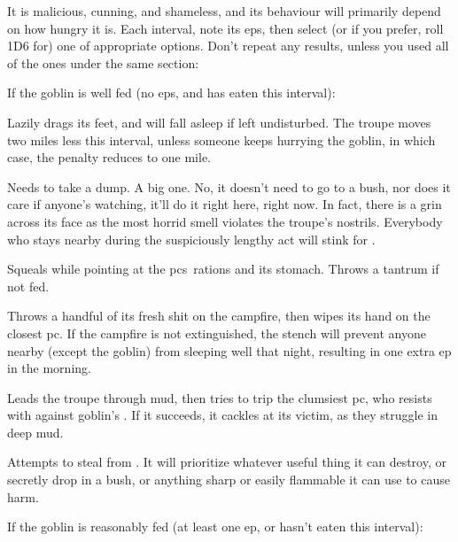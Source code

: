 \documentclass[10pt,twoside]{book}
\begin{document}
It is malicious, cunning, and shameless, and its behaviour will primarily depend on how hungry it is.
Each \gls{interval}, note its \glspl{ep}, then select (or if you prefer, roll 1D6 for) one of appropriate options.
Don't repeat any results, unless you used all of the ones under the same section:

If the goblin is well fed (no \glspl{ep}, and has eaten this \gls{interval}):


\begin{dlist}
  \item
  Lazily drags its feet, and will fall asleep if left undisturbed.
  The troupe moves two miles less this \gls{interval}, unless someone keeps hurrying the goblin, in which case, the penalty reduces to one mile.
  \item
  Needs to take a dump.
  A big one.
  No, it doesn't need to go to a bush, nor does it care if anyone's watching, it'll do it right here, right now.
  In fact, there is a grin across its face as the most horrid smell violates the troupe's nostrils.
  Everybody who stays nearby during the suspiciously lengthy act will stink for .
  \item
  Squeals while pointing at the \glspl{pc}~\glspl{ration} and its stomach.
  Throws a tantrum if not fed.
  \item
  Throws a handful of its fresh shit on the campfire, then wipes its hand on the closest \gls{pc}.
  If the campfire is not extinguished, the stench will prevent anyone nearby (except the goblin) from sleeping well that night, resulting in one extra \gls{ep} in the morning.
  \item
  Leads the troupe through mud, then tries to trip the clumsiest \gls{pc}, who resists with  against goblin's .
  If it succeeds, it cackles at its victim, as they struggle in deep mud.
  \item
  Attempts to steal from .
  It will prioritize whatever useful thing it can destroy, or secretly drop in a bush, or anything sharp or easily flammable it can use to cause harm.
\end{dlist}

If the goblin is reasonably fed (at least one \gls{ep}, or hasn't eaten this \gls{interval}):
\end{document}
